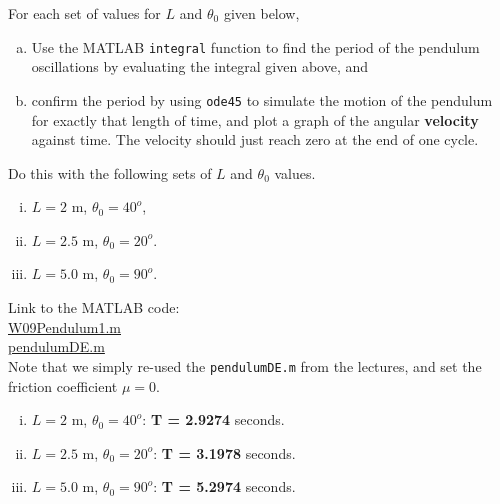 \begin{enumerate}[1.]
\begin{Question}
For each set of values for $L$ and $\theta_0$ given below,
\begin{enumerate}[(a)]
\item Use the MATLAB \verb#integral# function to find the period of
  the pendulum oscillations by evaluating the integral given above,
  and
\item confirm the period by using \verb#ode45# to simulate the motion
  of the pendulum for exactly that length of time, and plot a graph of
  the angular {\bf velocity} against time.  The velocity should just
  reach zero at the end of one cycle.
\end{enumerate}

Do this with the following sets of $L$ and $\theta_0$ values.
\begin{enumerate}[(i)]
\item $L = 2$ m, $\theta_0 = 40^o$, 
\item $L =2.5$ m, $\theta_0 = 20^o$.
\item $L =5.0$ m, $\theta_0 = 90^o$.
\end{enumerate}
  \end{Question}

\begin{Solution}

Link to the MATLAB code: \\
\href{http://www.mast.queensu.ca/~apsc171/MNTCP01/PracticeProblems/MATLAB/W09Pendulum1.m}{W09Pendulum1.m} \\
\href{http://www.mast.queensu.ca/~apsc171/MNTCP01/PracticeProblems/MATLAB/pendulumDE.m}{pendulumDE.m} \\

Note that we simply re-used the \verb#pendulumDE.m# from the lectures,
and set the friction coefficient $\mu = 0$.
  \begin{enumerate}[(i)]
  \item $L = 2$ m, $\theta_0 = 40^o$:  {\bf T = 2.9274} seconds.
  \item $L =2.5$ m, $\theta_0 = 20^o$: {\bf T = 3.1978} seconds.
  \item $L =5.0$ m, $\theta_0 = 90^o$: {\bf T = 5.2974} seconds.
  \end{enumerate}


\end{Solution}
\end{enumerate}
